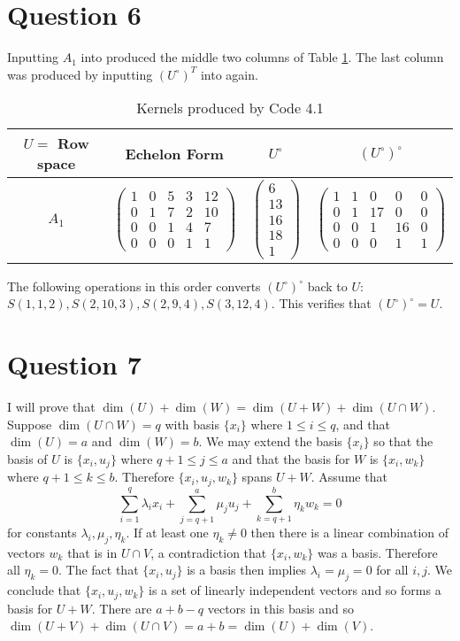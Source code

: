 \documentclass[10pt,a4paper,notitlepage]{article}
\begin{document}
\section*{\centering \large Question 6}
Inputting $A_{1}$ into  produced the middle two columns of Table \ref{TabQ6}. The last column was produced by inputting $(U^{\circ})^{T}$ into  again.
\begin{table}[H]
\centering
\begin{tabular}{|c|c|c|c|}
\hline
$U=$ Row space & Echelon Form & $U^{\circ}$ & $(U^{\circ})^{\circ}$\\
\hline
$A_{1}$ & $\begin{pmatrix}1&0&5&3&12\\0&1&7&2&10\\0&0&1&4&7\\0&0&0&1&1\end{pmatrix}$ & $\begin{pmatrix}6\\13\\16\\18\\1\end{pmatrix}$ & $\begin{pmatrix}1&1&0&0&0\\0&1&17&0&0\\0&0&1&16&0\\0&0&0&1&1\end{pmatrix}$\\
\hline
\end{tabular}
\caption{Kernels produced by Code 4.1}
\label{TabQ6}
\end{table}
The following operations in this order converts $(U^{\circ})^{\circ}$ back to $U$: $S(1,1,2), S(2,10,3), S(2,9,4), S(3,12,4)$. This verifies that $(U^{\circ})^{\circ}=U$.

\section*{\centering \large Question 7}
I will prove that $\dim(U) +\dim(W) =\dim(U+W) +\dim(U\cap W)$. Suppose $\dim(U\cap W)=q$ with basis $\{x_{i}\}$ where $1\leq i \leq q$, and that $\dim(U)=a$ and $\dim(W)=b$. We may extend the basis $\{x_{i}\}$ so that the basis of $U$ is $\{ x_{i},u_{j}\}$ where $q+1\leq j\leq a$ and that the basis for $W$ is $\{ x_{i}, w_{k}\}$ where $q+1\leq k \leq b$. Therefore $\{x_{i},  u_{j}, w_{k}\}$ spans $U+W$. Assume that 
\begin{equation}
\sum_{i=1}^{q}\lambda_{i}x_{i} +\sum_{j=q+1}^{a}\mu_{j}u_{j}+\sum_{k=q+1}^{b}\eta_{k}w_{k}=0
\end{equation}
for constants $\lambda_{i},\mu_{j}, \eta_{k}$. If at least one $\eta_{k}\neq 0$ then there is a linear combination of vectors $w_{k}$ that is in $U\cap V$, a contradiction that $\{x_{i}, w_{k}\}$ was a basis. Therefore all $\eta_{k}=0$. The fact that $\{x_{i}, u_{j}\}$ is a basis then implies $\lambda_{i}=\mu_{j}=0$ for all $i,j$. We conclude that $\{x_{i}, u_{j}, w_{k}\}$ is a set of linearly independent vectors and so forms a basis for $U+W$. There are $a+b-q$ vectors in this basis and so $\dim(U+V)+\dim(U\cap V)=a+b=\dim(U)+\dim(V)$.\\
\end{document}

